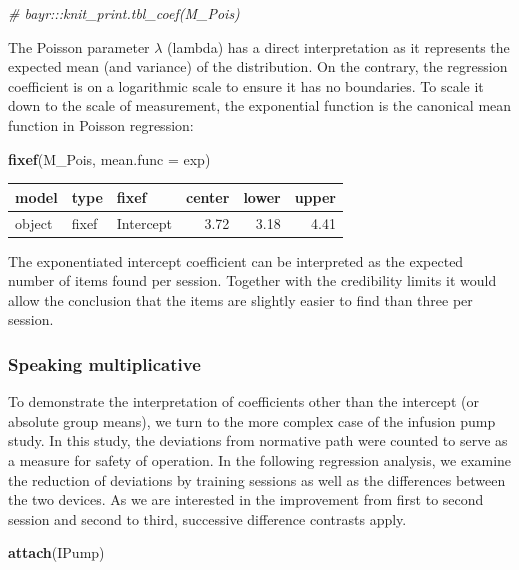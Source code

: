 \documentclass[]{svmono}
\newenvironment{Shaded}{\begin{snugshade}}{\end{snugshade}}
\newcommand{\KeywordTok}[1]{\textcolor[rgb]{0.13,0.29,0.53}{\textbf{#1}}}
\newcommand{\DataTypeTok}[1]{\textcolor[rgb]{0.13,0.29,0.53}{#1}}
\newcommand{\CommentTok}[1]{\textcolor[rgb]{0.56,0.35,0.01}{\textit{#1}}}
\newcommand{\NormalTok}[1]{#1}
\begin{document}
\begin{Shaded}
\begin{Highlighting}[]
\CommentTok{# bayr:::knit_print.tbl_coef(M_Pois)}
\end{Highlighting}
\end{Shaded}

The Poisson parameter \(\lambda\) (lambda) has a direct interpretation
as it represents the expected mean (and variance) of the distribution.
On the contrary, the regression coefficient is on a logarithmic scale to
ensure it has no boundaries. To scale it down to the scale of
measurement, the exponential function is the canonical mean function in
Poisson regression:

\begin{Shaded}
\begin{Highlighting}[]
\KeywordTok{fixef}\NormalTok{(M_Pois, }\DataTypeTok{mean.func =}\NormalTok{ exp)}
\end{Highlighting}
\end{Shaded}

\begin{longtable}[]{@{}lllrrr@{}}
\toprule
model & type & fixef & center & lower & upper\tabularnewline
\midrule
\endhead
object & fixef & Intercept & 3.72 & 3.18 & 4.41\tabularnewline
\bottomrule
\end{longtable}

The exponentiated intercept coefficient can be interpreted as the
expected number of items found per session. Together with the
credibility limits it would allow the conclusion that the items are
slightly easier to find than three per session.

\subsubsection{Speaking multiplicative}\label{speaking-multiplicative}

To demonstrate the interpretation of coefficients other than the
intercept (or absolute group means), we turn to the more complex case of
the infusion pump study. In this study, the deviations from normative
path were counted to serve as a measure for safety of operation. In the
following regression analysis, we examine the reduction of deviations by
training sessions as well as the differences between the two devices. As
we are interested in the improvement from first to second session and
second to third, successive difference contrasts apply.

\begin{Shaded}
\begin{Highlighting}[]
\KeywordTok{attach}\NormalTok{(IPump)}
\end{Highlighting}
\end{Shaded}
\end{document}
